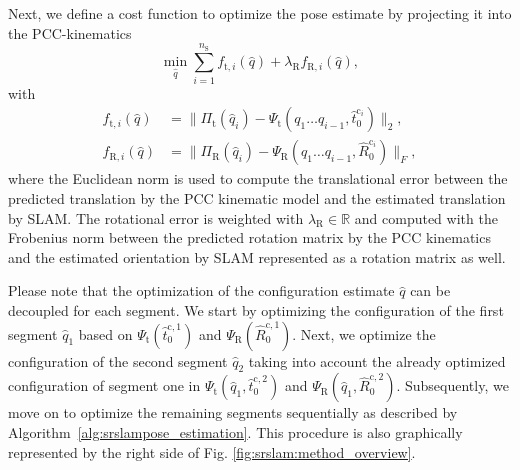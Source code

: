 Next, we define a cost function to optimize the pose estimate by projecting it into the \gls{PCC}-kinematics
%
\begin{equation}\label{eq:srslam:cost_fun}
    \min_{\hat{q}} \sum_{i=1}^{n_\mathrm{S}} f_{\mathrm{t},i}(\hat{q}) + \lambda_\mathrm{R} f_{\mathrm{R},i}(\hat{q}),
\end{equation}
with
\begin{equation}\label{eq:srslam:cost_fun_ingredients}
\begin{split}
    f_{\mathrm{t},i}(\hat{q}) &=
    \big\lVert 
    \Pi_\mathrm{t}(\hat{q}_i) - \Psi_\mathrm{t}(q_1 \dots q_{i-1}, \hat{t}_{0}^{\mathrm{c}_i})
    \big\rVert_2,\\
    f_{\mathrm{R},i}(\hat{q}) &=
    \big\lVert 
    \Pi_\mathrm{R}(\hat{q}_i) - \Psi_\mathrm{R}(q_1 \dots q_{i-1}, \hat{R}_{0}^{\mathrm{c}_i})
    \big\rVert_F,
\end{split}
\end{equation}
where the Euclidean norm is used to compute the translational error between the predicted translation by the \gls{PCC} kinematic model and the estimated translation by \gls{SLAM}. The rotational error is weighted with $\lambda_\mathrm{R} \in \mathbb{R}$ and computed with the Frobenius norm between the predicted rotation matrix by the \gls{PCC} kinematics and the estimated orientation by \gls{SLAM} represented as a rotation matrix as well.

Please note that the optimization of the configuration estimate $\hat{q}$ can be decoupled for each segment. 
We start by optimizing the configuration of the first segment $\hat{q}_1$ based on $\Psi_\mathrm{t}(\hat{t}_{0}^{\mathrm{c},1})$ and $\Psi_\mathrm{R}(\hat{R}_{0}^{\mathrm{c},1})$. Next, we optimize the configuration of the second segment $\hat{q}_2$ taking into account the already optimized configuration of segment one in $\Psi_\mathrm{t}(\hat{q}_1, \hat{t}_{0}^{\mathrm{c},2})$ and $\Psi_\mathrm{R}(\hat{q}_1, \hat{R}_{0}^{\mathrm{c},2})$. 
Subsequently, we move on to optimize the remaining segments sequentially as described by Algorithm~\ref{alg:srslampose_estimation}. This procedure is also graphically represented by the right side of Fig. \ref{fig:srslam:method_overview}.

